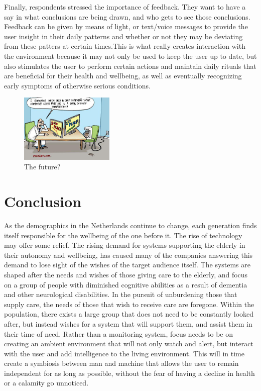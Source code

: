 \documentclass{below-ext}
\begin{document}
Finally, respondents stressed the importance of feedback. They want to have a say in what conclusions are being drawn, and who gets to see those conclusions. Feedback can be given by means of light, or text/voice messages to provide the user insight in their daily patterns and whether or not they may be deviating from these patters at certain times.This is what really creates interaction with the environment because it may not only be used to keep the user up to date, but also stimulates the user to perform certain actions and maintain daily rituals that are beneficial for their health and wellbeing, as well as eventually recognizing early symptoms of otherwise serious conditions.

\begin{figure}
\centering
\includegraphics[width=0.4\textwidth]{joke}
\caption{The future?}
\label{fig:joke}
\end{figure}
\clearpage
\section{Conclusion}
As the demographics in the Netherlands continue to change, each generation finds itself responsible for the wellbeing of the one before it. The rise of technology may offer some relief. The rising demand for systems supporting the elderly in their autonomy and wellbeing, has caused many of the companies answering this demand to lose sight of the wishes of the target audience itself. The systems are shaped after the needs and wishes of those giving care to the elderly, and focus on a group of people with diminished cognitive abilities as a result of dementia and other neurological disabilities. In the pursuit of unburdening those that supply care, the needs of those that wish to receive care are foregone. Within the population, there exists a large group that does not need to be constantly looked after, but instead wishes for a system that will support them, and assist them in their time of need. Rather than a monitoring system, focus needs to be on creating an ambient environment that will not only watch and alert, but interact with the user and add intelligence to the living environment. This will in time create a symbiosis between man and machine that allows the user to remain independent for as long as possible, without the fear of having a decline in health or a calamity go unnoticed.
\end{document}
